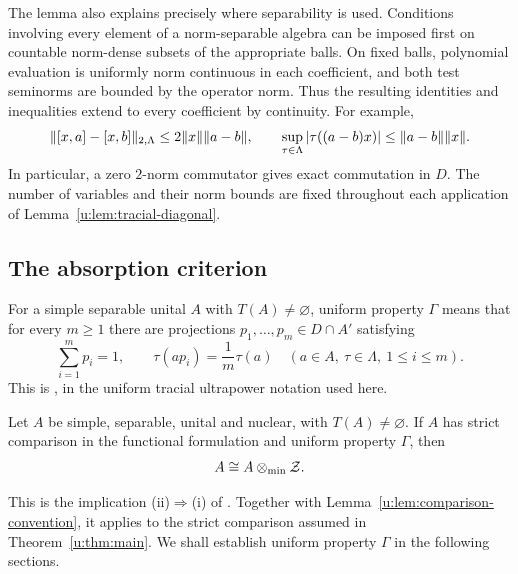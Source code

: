 The lemma also explains precisely where separability is used.
Conditions involving every element of a norm-separable algebra
can be imposed first on countable norm-dense subsets of the
appropriate balls. On fixed balls, polynomial evaluation is
uniformly norm continuous in each coefficient, and both test
seminorms are bounded by the operator norm. Thus the resulting
identities and inequalities extend to every coefficient by
continuity. For example,
\[
 \lVert[x,a]-[x,b]\rVert_{2,\Lambda}
       \le2\lVert x\rVert\lVert a-b\rVert,\qquad
 \sup_{\tau\in\Lambda}|\tau((a-b)x)|
       \le\lVert a-b\rVert\lVert x\rVert.
\]
In particular, a zero $2$-norm commutator gives exact commutation
in $D$. The number of variables and their norm bounds are fixed
throughout each application of Lemma~\ref{u:lem:tracial-diagonal}.

\subsection{The absorption criterion}

\begin{definition}
\label{u:def:uniform-gamma}
For a simple separable unital $A$ with $T(A)\ne\varnothing$, uniform
property $\Gamma$ means that for every $m\ge1$ there are
projections $p_1,\ldots,p_m\in D\cap A'$ satisfying
\[
 \sum_{i=1}^m p_i=1,
 \qquad
 \tau(ap_i)=\frac{1}{m}\tau(a)
 \quad(a\in A,\ \tau\in\Lambda,\ 1\le i\le m).
\]
This is \cite[Definition~2.1 and Equation~(2.1)]{CETW}, in the
uniform tracial ultrapower notation used here.
\end{definition}

\begin{theorem}
\label{u:thm:gamma-criterion}
Let $A$ be simple, separable, unital and nuclear, with
$T(A)\ne\varnothing$. If $A$ has strict comparison in the
functional formulation and uniform property $\Gamma$, then
\[
 A\cong A\otimes_{\min}\mathcal Z.
\]
\end{theorem}

This is the implication (ii)$\Rightarrow$(i) of
\cite[Theorem~5.6]{CETW}. Together with
Lemma~\ref{u:lem:comparison-convention}, it applies to the strict
comparison assumed in Theorem~\ref{u:thm:main}. We shall establish
uniform property $\Gamma$ in the following sections.
